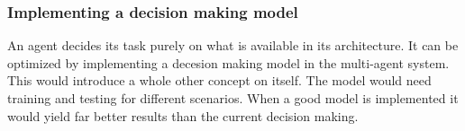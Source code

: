 \subsubsection{Implementing a decision making model}

An agent decides its task purely on what is available in its architecture. It can be optimized by implementing a decesion making 
model in the multi-agent system. This would introduce a whole other concept on itself. The model would need training and testing for 
different scenarios. When a good model is implemented it would yield far better results than the current decision making.